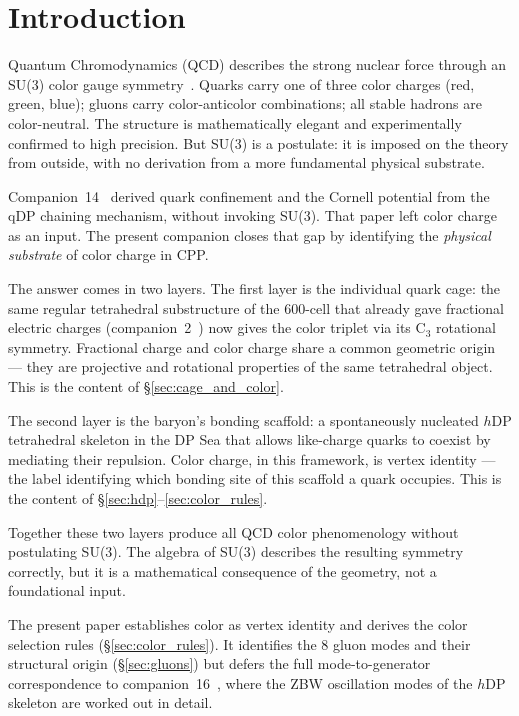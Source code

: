 \documentclass[12pt]{article}
\newcommand{\hDP}{h\mathrm{DP}}
\begin{document}
\section{Introduction}
\label{sec:intro}

Quantum Chromodynamics (QCD) describes the strong nuclear force
through an SU(3) color gauge symmetry~\cite{gross1973,politzer1973}.
Quarks carry one of three color charges (red, green, blue); gluons
carry color-anticolor combinations; all stable hadrons are
color-neutral.  The structure is mathematically elegant and
experimentally confirmed to high precision.  But SU(3) is a
postulate: it is imposed on the theory from outside, with no
derivation from a more fundamental physical substrate.

Companion~14~\cite{c14} derived quark confinement and the Cornell
potential from the qDP chaining mechanism, without invoking SU(3).
That paper left color charge as an input.  The present companion
closes that gap by identifying the \emph{physical substrate} of
color charge in CPP.

The answer comes in two layers.  The first layer is the individual
quark cage: the same regular tetrahedral substructure of the 600-cell
that already gave fractional electric charges (companion~2~\cite{c2})
now gives the color triplet via its C$_3$ rotational symmetry.
Fractional charge and color charge share a common geometric origin
--- they are projective and rotational properties of the same
tetrahedral object.  This is the content of §\ref{sec:cage_and_color}.

The second layer is the baryon's bonding scaffold: a spontaneously
nucleated $\hDP$ tetrahedral skeleton in the DP Sea that allows
like-charge quarks to coexist by mediating their repulsion.  Color
charge, in this framework, is vertex identity --- the label
identifying which bonding site of this scaffold a quark occupies.
This is the content of §\ref{sec:hdp}--\ref{sec:color_rules}.

Together these two layers produce all QCD color phenomenology without
postulating SU(3).  The algebra of SU(3) describes the resulting
symmetry correctly, but it is a mathematical consequence of the
geometry, not a foundational input.

The present paper establishes color as vertex identity and derives
the color selection rules (§\ref{sec:color_rules}).  It identifies
the 8 gluon modes and their structural origin (§\ref{sec:gluons})
but defers the full mode-to-generator correspondence to
companion~16~\cite{c16}, where the ZBW oscillation modes of the
$\hDP$ skeleton are worked out in detail.
\end{document}
